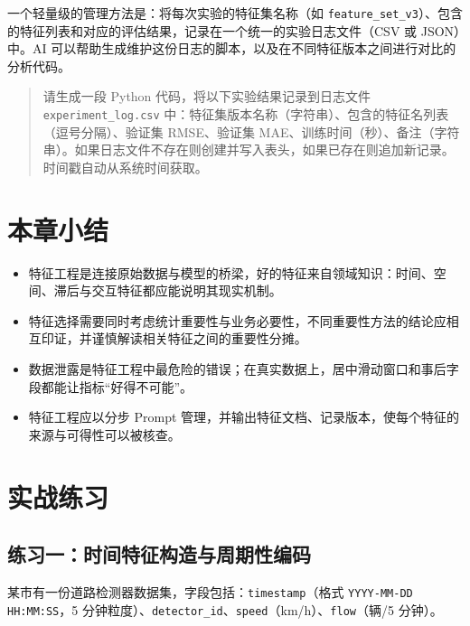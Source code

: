 一个轻量级的管理方法是：将每次实验的特征集名称（如 \texttt{feature\_set\_v3}）、包含的特征列表和对应的评估结果，记录在一个统一的实验日志文件（CSV 或 JSON）中。AI 可以帮助生成维护这份日志的脚本，以及在不同特征版本之间进行对比的分析代码。

\begin{quote}
请生成一段 Python 代码，将以下实验结果记录到日志文件 \texttt{experiment\_log.csv} 中：特征集版本名称（字符串）、包含的特征名列表（逗号分隔）、验证集 RMSE、验证集 MAE、训练时间（秒）、备注（字符串）。如果日志文件不存在则创建并写入表头，如果已存在则追加新记录。时间戳自动从系统时间获取。
\end{quote}


\section{本章小结}

\begin{itemize}
  \item 特征工程是连接原始数据与模型的桥梁，好的特征来自领域知识：时间、空间、滞后与交互特征都应能说明其现实机制。
  \item 特征选择需要同时考虑统计重要性与业务必要性，不同重要性方法的结论应相互印证，并谨慎解读相关特征之间的重要性分摊。
  \item 数据泄露是特征工程中最危险的错误；在真实数据上，居中滑动窗口和事后字段都能让指标“好得不可能”。
  \item 特征工程应以分步 Prompt 管理，并输出特征文档、记录版本，使每个特征的来源与可得性可以被核查。
\end{itemize}

\section{实战练习}

\subsection*{练习一：时间特征构造与周期性编码}

某市有一份道路检测器数据集，字段包括：\texttt{timestamp}（格式 \texttt{YYYY-MM-DD HH:MM:SS}，5 分钟粒度）、\texttt{detector\_id}、\texttt{speed}（km/h）、\texttt{flow}（辆/5 分钟）。

